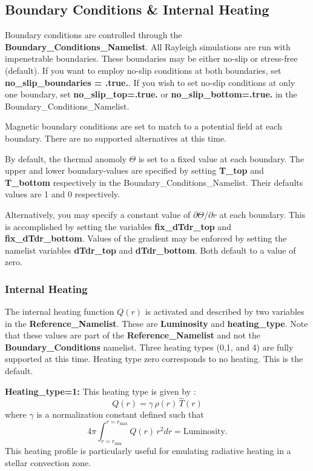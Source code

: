 \subsection{Boundary Conditions \& Internal Heating}\label{sec:boundary_conditions}
Boundary conditions are controlled through the \textbf{Boundary\_Conditions\_Namelist}. All Rayleigh simulations are run with impenetrable boundaries. These boundaries may be either no-slip or stress-free (default).  If you want to employ no-slip conditions at both boundaries, set \textbf{no\_slip\_boundaries = .true.}.  If you wish to set no-slip conditions at only one boundary, set \textbf{no\_slip\_top=.true.} or \textbf{no\_slip\_bottom=.true.} in the Boundary\_Conditions\_Namelist.

Magnetic boundary conditions are set to match to a potential field at each boundary.  There are no supported alternatives at this time.

By default, the thermal anomoly $\Theta$ is set to a fixed value at each boundary.   The upper and lower boundary-values are specified by setting \textbf{T\_top} and \textbf{T\_bottom} respectively in the Boundary\_Conditions\_Namelist.  Their defaults values are 1 and 0 respectively.

Alternatively, you may specify a constant value of $\partial\Theta/\partial r$ at each boundary.  This is accomplished by setting the variables \textbf{fix\_dTdr\_top} and \textbf{fix\_dTdr\_bottom}.   Values of the gradient may be enforced by setting the namelist variables \textbf{dTdr\_top} and \textbf{dTdr\_bottom}.  Both default to a value of zero.
\subsubsection{Internal Heating}
The internal heating function $Q(r)$ is activated and described by two variables in the \textbf{Reference\_Namelist}.   These are \textbf{Luminosity} and \textbf{heating\_type}.  Note that these values are part of the \textbf{Reference\_Namelist} and not the \textbf{Boundary\_Conditions} namelist.  Three heating types (0,1, and 4) are fully supported at this time. Heating type zero corresponds to no heating.  This is the default.


\textbf{Heating\_type=1:}
This heating type is given by :
\begin{equation}
\label{eq:heating}
Q(r)= \gamma\,\hat{\rho}(r)\, \hat{T}(r)
\end{equation}
where $\gamma$ is a normalization constant defined such that
\begin{equation}
\label{eq:lum}
4\pi\int_{r=r_\mathrm{min}}^{r=r_\mathrm{max}} Q(r)\,  r^2 dr = \mathrm{Luminosity}.
\end{equation}
This heating profile is particularly useful for emulating radiative heating in a stellar convection zone.

